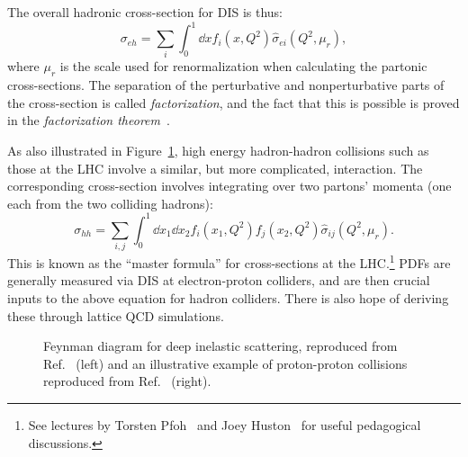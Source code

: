 The overall hadronic cross-section for DIS is thus:
\begin{equation}
	\label{eq:01_sm_qcd_sigma_ep}
	\sigma_{eh} = \sum_{i} \int_0^1 \dd x f_i(x, Q^2) \hat\sigma_{ei}(Q^2, \mu_r),
\end{equation}
where $\mu_r$ is the scale used for renormalization when calculating the partonic cross-sections.
The separation of the perturbative and nonperturbative parts of the cross-section is called \textit{factorization}, and the fact that this is possible is proved in the \textit{factorization theorem}~\cite{Collins:1989gx}.

As also illustrated in Figure~\ref{fig:01_sm_qcd_dis}, high energy hadron-hadron collisions such as those at the LHC involve a similar, but more complicated, interaction.
The corresponding cross-section involves integrating over two partons' momenta (one each from the two colliding hadrons):
\begin{equation}
	\label{eq:01_sm_qcd_sigma_pp}
	\sigma_{hh} = \sum_{i, j} \int_0^1 \dd x_1 \dd x_2 f_i(x_1, Q^2) f_j(x_2, Q^2) \hat\sigma_{ij}(Q^2, \mu_r).
\end{equation}
This is known as the ``master formula'' for cross-sections at the LHC.\footnote{See lectures by Torsten Pfoh~\cite{Pfoh:2012Lectures} and Joey Huston~\cite{Huston:2018Lectures} for useful pedagogical discussions.}
PDFs are generally measured via DIS at electron-proton colliders, and are then crucial inputs to the above equation for hadron colliders.
There is also hope of deriving these through lattice QCD simulations.

\begin{figure}
	\centering
	\hspace{1cm}
	\caption{Feynman diagram for deep inelastic scattering, reproduced from Ref.~\cite{enwiki:1240848406} (left) and an illustrative example of proton-proton collisions reproduced from Ref.~\cite{ATLAS:2024protoncollisions} (right).}
	\label{fig:01_sm_qcd_dis}
\end{figure}

